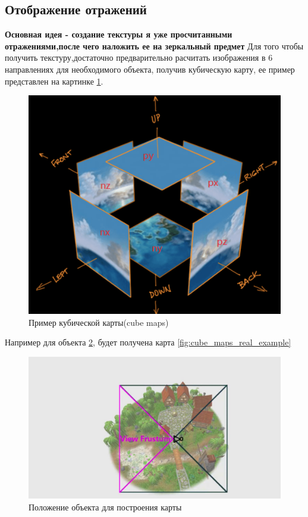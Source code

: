 \documentclass[a4paper,14pt, unknownkeysallowed]{extreport}
\begin{document}
\subsection{Отображение отражений}
\textbf{Основная идея - создание текстуры я уже просчитанными отражениями,после чего наложить ее на зеркальный предмет} \newline
Для того чтобы получить текстуру,достаточно предварительно расчитать изображения в 6 направлениях для необходимого объекта, получив кубическую карту, ее пример представлен на картинке \ref{fig:cube_maps}.\cite{reflexion_types}
\begin{figure}[h]
	\centering
	\includegraphics[scale=0.4]{cube_maps}
	\caption{Пример кубической карты(cube maps)}
	\label{fig:cube_maps}
\end{figure}

Например для объекта \ref{fig:cube_maps_real}, будет получена карта \ref{fig:cube_maps_real_example}


\begin{figure}[H]
	\centering
	\includegraphics[scale=0.4]{cube_maps_real}
	\caption{Положение объекта для построения карты}
	\label{fig:cube_maps_real}
\end{figure}
\end{document}

